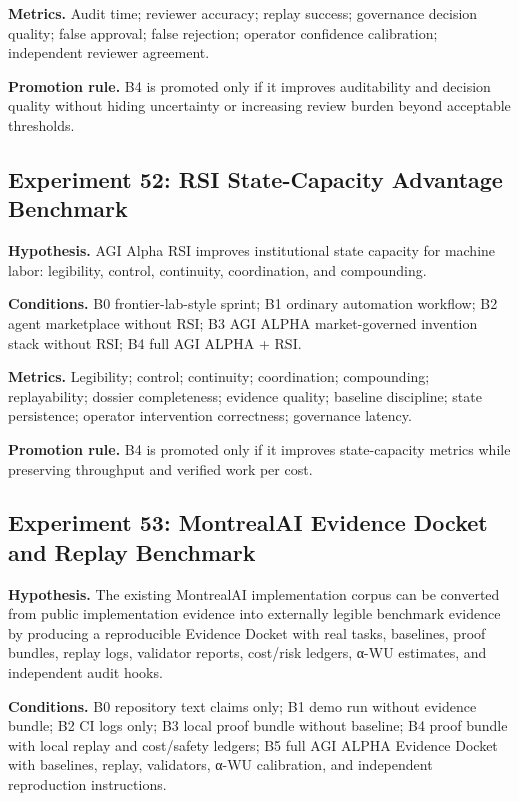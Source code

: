 \textbf{Metrics.} Audit time; reviewer accuracy; replay success;
governance decision quality; false approval; false rejection; operator
confidence calibration; independent reviewer agreement.

\textbf{Promotion rule.} B4 is promoted only if it improves auditability
and decision quality without hiding uncertainty or increasing review
burden beyond acceptable thresholds.

\subsection{Experiment 52: RSI State-Capacity Advantage
Benchmark}\label{experiment-52-rsi-state-capacity-advantage-benchmark}

\textbf{Hypothesis.} AGI Alpha RSI improves institutional state capacity
for machine labor: legibility, control, continuity, coordination, and
compounding.

\textbf{Conditions.} B0 frontier-lab-style sprint; B1 ordinary
automation workflow; B2 agent marketplace without RSI; B3 AGI ALPHA
market-governed invention stack without RSI; B4 full AGI ALPHA + RSI.

\textbf{Metrics.} Legibility; control; continuity; coordination;
compounding; replayability; dossier completeness; evidence quality;
baseline discipline; state persistence; operator intervention
correctness; governance latency.

\textbf{Promotion rule.} B4 is promoted only if it improves
state-capacity metrics while preserving throughput and verified work per
cost.

\subsection{Experiment 53: MontrealAI Evidence Docket and Replay
Benchmark}\label{experiment-53-montrealai-evidence-docket-and-replay-benchmark}

\textbf{Hypothesis.} The existing MontrealAI implementation corpus can
be converted from public implementation evidence into externally legible
benchmark evidence by producing a reproducible Evidence Docket with real
tasks, baselines, proof bundles, replay logs, validator reports,
cost/risk ledgers, α-WU estimates, and independent audit hooks.

\textbf{Conditions.} B0 repository text claims only; B1 demo run without
evidence bundle; B2 CI logs only; B3 local proof bundle without
baseline; B4 proof bundle with local replay and cost/safety ledgers; B5
full AGI ALPHA Evidence Docket with baselines, replay, validators, α-WU
calibration, and independent reproduction instructions.


